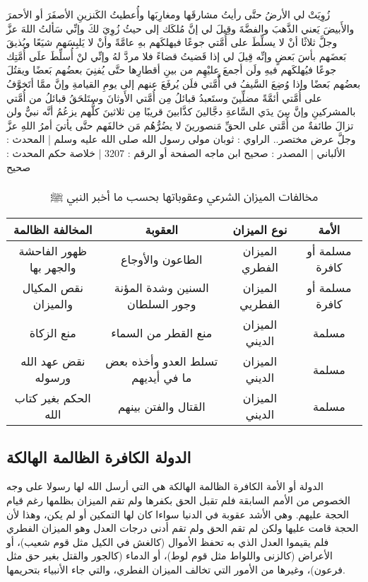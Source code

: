 زُوِيَتْ لي الأرضُ حتَّى رأيتُ مشارقَها ومغارِبَها وأُعطيتُ الكَنزينِ الأصفَرَ أو الأحمرَ والأَبيضَ يَعني الذَّهبَ والفضَّةَ وقِيلَ لي إنَّ مُلكَك إلى حيثُ زُوِيَ لكَ وإنِّي سَألتُ اللهَ عزَّ وجلَّ ثلاثًا أنْ لا يسلِّطَ على أُمَّتي جوعًا فيهلكَهم بهِ عامَّةً وأنْ لا يَلبِسَهم شيَعًا ويُذيقَ بَعضَهم بأسَ بَعضٍ وإنِّه قِيلَ لي إذا قَضيتُ قضاءً فلا مردَّ لهُ وإنِّي لنْ أُسلِّطَ علَى أُمَّتِك جوعًا فيُهلكَهم فيهِ ولَن أجمعَ عليْهِم من بينِ أقطارِها حتَّى يُفنِيَ بعضُهم بَعضًا ويقتُلَ بعضُهم بَعضًا وإذا وُضِعَ السَّيفُ في أَُّمَّتي فلَن يُرفَعَ عنهم إلى يومِ القيامةِ وإنَّ ممَّا أتَخوَّفُ على أُمَّتي أئمَّةً مضلِّينَ وستَعبدُ قبائلُ مِن أُمَّتي الأَوثانَ وستَلحَقُ قبائلُ من أُمَّتي بالمشركينِ وإنَّ بينَ يدَي السَّاعةِ دجَّالينَ كذَّابينَ قريبًا مِن ثلاثينَ كلُّهم يزعُمُ أنَّه نبيٌّ ولن تزالَ طائفةٌ من أُمَّتي على الحقِّ مَنصورينَ لا يضُرُّهُم مَن خالفَهم حتَّى يأتيَ أمرُ اللهِ عزَّ وجلَّ
عرض مختصر..
الراوي : ثوبان مولى رسول الله صلى الله عليه وسلم | المحدث : الألباني | المصدر : صحيح ابن ماجه
الصفحة أو الرقم : 3207 | خلاصة حكم المحدث : صحيح

\begin{table}[h]
\centering
\begin{tabular}{|c|c|c|c|}
\hline
\textbf{المخالفة الظالمة} & \textbf{العقوبة} & \textbf{نوع الميزان} & \textbf{الأمة}  \\
\hline
ظهور الفاحشة والجهر بها & الطاعون والأوجاع & الميزان الفطري & مسلمة أو كافرة \\
\hline
نقص المكيال والميزان & السنين وشدة المؤنة وجور السلطان & الميزان الفطريي & مسلمة أو كافرة \\
\hline
منع الزكاة & منع القطر من السماء  & الميزان الديني & مسلمة \\
\hline
نقض عهد الله ورسوله & تسلط العدو وأخذه بعض ما في أيديهم & الميزان الديني & مسلمة \\
\hline
الحكم بغير كتاب الله & القتال والفتن بينهم & الميزان الديني & مسلمة \\
\hline
\end{tabular}
\caption{مخالفات الميزان الشرعي وعقوباتها بحسب ما أخبر النبي ﷺ}
\label{tab:violations}
\end{table}


\subsection{الدولة الكافرة الظالمة الهالكة}

الدولة أو الأمة الكافرة الظالمة الهالكة هي التي أرسل الله لها رسولا على وجه الخصوص من الأمم السابقة فلم تقبل الحق بكفرها ولم تقم الميزان بظلمها رغم قيام الحجة عليهم. وهي الأشد عقوبة في الدنيا سواءا كان لها التمكين أو لم يكن، وهذا لأن الحجة قامت عليها ولكن لم تقم الحق ولم تقم أدنى درجات العدل وهو الميزان الفطري فلم يقيموا العدل الذي به تحفظ الأموال (كالغش في الكيل مثل قوم شعيب)، أو الأعراض (كالزنى واللواط مثل قوم لوط)، أو الدماء (كالجور والقتل بغير حق مثل فرعون)، وغيرها من الأمور التي تخالف الميزان الفطري، والتي جاء الأنبياء بتحريمها.

